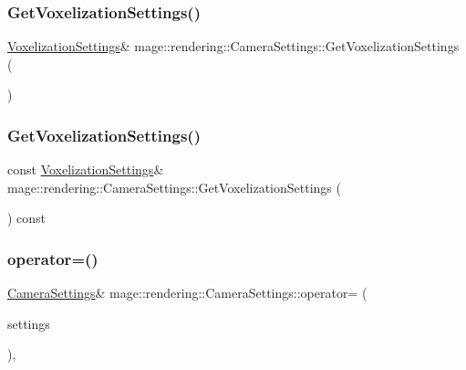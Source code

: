 \subsubsection{\texorpdfstring{Get\+Voxelization\+Settings()}{GetVoxelizationSettings()}\hspace{0.1cm}{\footnotesize\ttfamily [1/2]}}
{\footnotesize\ttfamily \hyperlink{classmage_1_1rendering_1_1_voxelization_settings}{Voxelization\+Settings}\& mage\+::rendering\+::\+Camera\+Settings\+::\+Get\+Voxelization\+Settings (\begin{DoxyParamCaption}{ }\end{DoxyParamCaption})\hspace{0.3cm}{\ttfamily [noexcept]}}

\hypertarget{classmage_1_1rendering_1_1_camera_settings_a2e3906063aa11044dc325affee24aeb1}{}\label{classmage_1_1rendering_1_1_camera_settings_a2e3906063aa11044dc325affee24aeb1} 
\subsubsection{\texorpdfstring{Get\+Voxelization\+Settings()}{GetVoxelizationSettings()}\hspace{0.1cm}{\footnotesize\ttfamily [2/2]}}
{\footnotesize\ttfamily const \hyperlink{classmage_1_1rendering_1_1_voxelization_settings}{Voxelization\+Settings}\& mage\+::rendering\+::\+Camera\+Settings\+::\+Get\+Voxelization\+Settings (\begin{DoxyParamCaption}{ }\end{DoxyParamCaption}) const\hspace{0.3cm}{\ttfamily [noexcept]}}

\hypertarget{classmage_1_1rendering_1_1_camera_settings_a8cc59c883ea4c45a6bb7e9dc728856fd}{}\label{classmage_1_1rendering_1_1_camera_settings_a8cc59c883ea4c45a6bb7e9dc728856fd} 
\subsubsection{\texorpdfstring{operator=()}{operator=()}\hspace{0.1cm}{\footnotesize\ttfamily [1/2]}}
{\footnotesize\ttfamily \hyperlink{classmage_1_1rendering_1_1_camera_settings}{Camera\+Settings}\& mage\+::rendering\+::\+Camera\+Settings\+::operator= (\begin{DoxyParamCaption}\item[{const \hyperlink{classmage_1_1rendering_1_1_camera_settings}{Camera\+Settings} \&}]{settings }\end{DoxyParamCaption})\hspace{0.3cm}{\ttfamily [default]}, {\ttfamily [noexcept]}}

